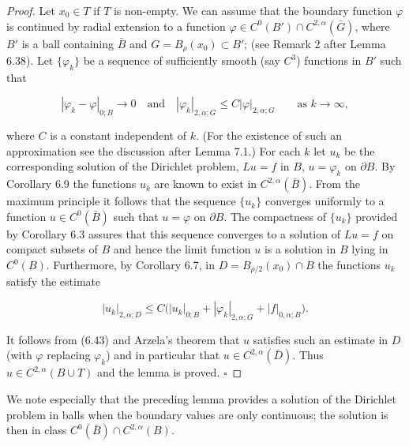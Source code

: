 \begin{proof}
Let $x_0 \in T$ if $T$ is non-empty. We can assume that the boundary function $\varphi$ is continued by radial extension to a function $\varphi \in C^0(B') \cap C^{2,\alpha}(\bar G)$, where $B'$ is a ball containing $\bar B$ and $G=B_{\rho}(x_0) \subset B'$; (see Remark 2 after Lemma 6.38). Let $\{\varphi_k\}$ be a sequence of sufficiently smooth (say $C^3$) functions in $B'$ such that

\begin{equation}
\tag{6.43}
|\varphi_k-\varphi|_{0;B} \to 0 \quad \text{and} \quad |\varphi_k|_{2,\alpha;G} \leq C|\varphi|_{2,\alpha;G} \qquad \text{as } k \to \infty,
\end{equation}

where $C$ is a constant independent of $k$. (For the existence of such an approximation see the discussion after Lemma 7.1.) For each $k$ let $u_k$ be the corresponding solution of the Dirichlet problem, $Lu=f$ in $B$, $u=\varphi_k$ on $\partial B$. By Corollary 6.9 the functions $u_k$ are known to exist in $C^{2,\alpha}(\bar B)$. From the maximum principle it follows that the sequence $\{u_k\}$ converges uniformly to a function $u \in C^0(\bar B)$ such that $u=\varphi$ on $\partial B$. The compactness of $\{u_k\}$ provided by Corollary 6.3 assures that this sequence converges to a solution of $Lu=f$ on compact subsets of $B$ and hence the limit function $u$ is a solution in $B$ lying in $C^0(B)$. Furthermore, by Corollary 6.7, in $D=B_{\rho/2}(x_0) \cap B$ the functions $u_k$ satisfy the estimate

\[
|u_k|_{2,\alpha;D} \leq C\bigl(|u_k|_{0;B} + |\varphi_k|_{2,\alpha;G} + |f|_{0,\alpha;B}\bigr).
\]

It follows from (6.43) and Arzela's theorem that $u$ satisfies such an estimate in $D$ (with $\varphi$ replacing $\varphi_k$) and in particular that $u \in C^{2,\alpha}(\bar D)$. Thus $u \in C^{2,\alpha}(B \cup T)$ and the lemma is proved. $\square$
\end{proof}

We note especially that the preceding lemma provides a solution of the Dirichlet problem in balls when the boundary values are only continuous; the solution is then in class $C^0(\bar B) \cap C^{2,\alpha}(B)$.

